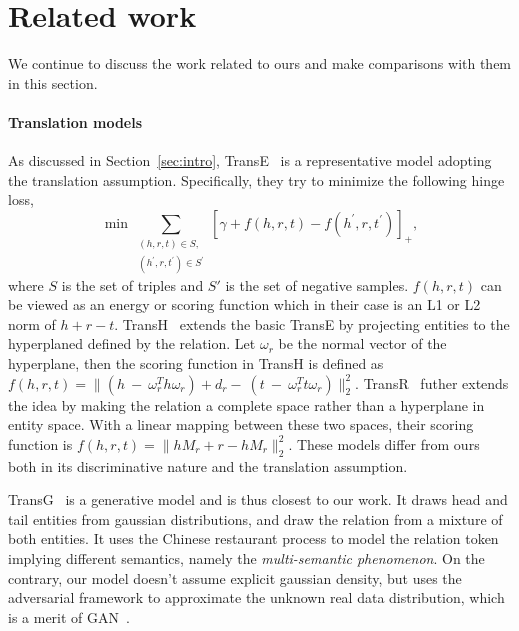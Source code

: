 \documentclass[twocolumn,a4paper,10pt,review,5p]{elsarticle}
\begin{document}

\section{Related work}

We continue to discuss the work related to ours and make comparisons with them in this section.

\paragraph{Translation models} As discussed in Section~\ref{sec:intro}, TransE~\cite{TransE2013} is a representative model adopting the translation assumption. Specifically, they try to minimize the following hinge loss,
\[
    \min\sum_{\substack{(h, r, t)\in S,\\ (h^\prime, r, t^\prime)\in S^\prime }}
        {\left[\gamma + f(h, r, t) - f(h^\prime, r, t^\prime)\right]}_+,
\]
where $S$ is the set of triples and $S'$ is the set of negative samples. $f(h, r, t)$ can be viewed as an energy or scoring function which in their case is an L1 or L2 norm of $h + r - t$. TransH~\cite{TransH2014} extends the basic TransE by projecting entities to the hyperplaned defined by the relation. Let $\omega_r$ be the normal vector of the hyperplane, then the scoring function in TransH is defined as $f(h, r, t) = \lVert(h~-~\omega_r^T h \omega_r) + d_r -~(t~-~\omega_r^T t \omega_r)\rVert_2^2 $.
TransR~\cite{TransR2015} futher extends the idea by making the relation a complete space rather than a hyperplane in entity space. With a linear mapping between these two spaces, their scoring function is $f(h, r, t) = \lVert hM_r + r - h M_r \rVert_2^2$. These models differ from ours both in its discriminative nature and the translation assumption.

TransG~\cite{TransG} is a generative model and is thus closest to our work. It draws head and tail entities from gaussian distributions, and draw the relation from a mixture of both entities. It uses the Chinese restaurant process to model the relation token implying different semantics, namely the \emph{multi-semantic phenomenon}.
On the contrary, our model doesn't assume explicit gaussian density, but uses the adversarial framework to approximate the unknown real data distribution, which is a merit of GAN~\cite{Goodfellow_2016}.
\end{document}
